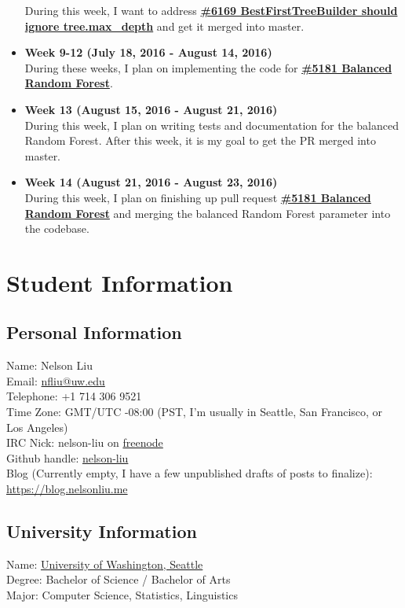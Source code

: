 \documentclass[12pt, oneside]{article}
\begin{document}
\begin{itemize}
  During this week, I want to address
  \textbf{\href{https://github.com/scikit-learn/scikit-learn/pull/6169}
    {\#6169 BestFirstTreeBuilder should ignore tree.max\_depth}} and
  get it merged into master.
  \item 
  \textbf{Week 9-12 (July 18, 2016 - August 14, 2016)}\\
  During these weeks, I plan on implementing the code for
  \textbf{\href{https://github.com/scikit-learn/scikit-learn/pull/5181}
    {\#5181 Balanced Random Forest}}.
  \item
  \textbf{Week 13 (August 15, 2016 - August 21, 2016)}\\
  During this week, I plan on writing tests and documentation for the
  balanced Random Forest. After this week, it is my goal to get the PR
  merged into master.
  \item
  \textbf{Week 14 (August 21, 2016 - August 23, 2016)}\\
  During this week, I plan on finishing up pull request
  \textbf{\href{https://github.com/scikit-learn/scikit-learn/pull/5181}
    {\#5181 Balanced Random Forest}} and merging the balanced Random
  Forest parameter into the codebase.
\end{itemize}
\section{Student Information}
\subsection{Personal Information}
Name: Nelson Liu\\
Email: \href{mailto:nfliu@uw.edu}{nfliu@uw.edu}\\
Telephone: +1 714 306 9521\\
Time Zone: GMT/UTC -08:00 (PST, I'm usually in Seattle, San Francisco,
or Los Angeles)\\
IRC Nick: nelson-liu on \href{https://webchat.freenode.net/}{freenode}\\
Github handle: \href{https://github.com/nelson-liu}{nelson-liu}\\
Blog (Currently empty, I have a few unpublished drafts of posts to finalize):
\href{http://blog.nelsonliu.me}{https://blog.nelsonliu.me}\\
\subsection{University Information}
Name: \href{http://www.washington.edu/}{University of Washington, Seattle}\\
Degree: Bachelor of Science / Bachelor of Arts\\
Major: Computer Science, Statistics, Linguistics
\end{document}
